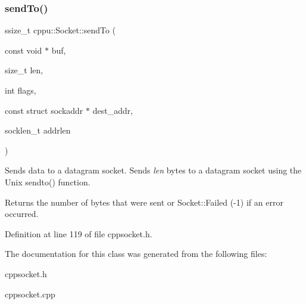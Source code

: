 \subsubsection{\texorpdfstring{sendTo()}{sendTo()}}
{\footnotesize\ttfamily ssize\+\_\+t cppu\+::\+Socket\+::send\+To (\begin{DoxyParamCaption}\item[{const void $\ast$}]{buf,  }\item[{size\+\_\+t}]{len,  }\item[{int}]{flags,  }\item[{const struct sockaddr $\ast$}]{dest\+\_\+addr,  }\item[{socklen\+\_\+t}]{addrlen }\end{DoxyParamCaption})\hspace{0.3cm}{\ttfamily [inline]}}



Sends data to a datagram socket. Sends {\itshape len} bytes to a datagram socket using the Unix sendto() function. 

\begin{DoxyReturn}{Returns}
the number of bytes that were sent or Socket\+::\+Failed (-\/1) if an error occurred. 
\end{DoxyReturn}


Definition at line 119 of file cppsocket.\+h.


\begin{DoxyCode}{0}

\end{DoxyCode}


The documentation for this class was generated from the following files\+:\begin{DoxyCompactItemize}
\item 
cppsocket.\+h\item 
cppsocket.\+cpp\end{DoxyCompactItemize}
